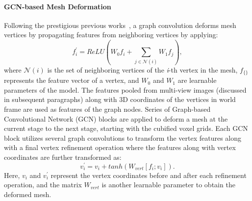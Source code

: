 \paragraph{GCN-based Mesh Deformation}\vspace{-4mm}
Following the prestigious previous works~\cite{wang2018pixel2mesh,wen2019pixel2mesh++}, a graph convolution deforms mesh vertices by propagating features from neighboring vertices by applying:
\begin{equation}
f_{i}^{'} = ReLU(W_0f_i + \sum_{j \in \mathcal{N}(i)} W_1 f_j),
\end{equation}
where $\mathcal{N}(i)$ is the set of neighboring vertices of the \emph{i}-th vertex in the mesh, $f_{\{\}}$ represents the feature vector of a vertex, and $W_0$ and $W_1$ are learnable parameters of the model.
The features pooled from multi-view images (discussed in subsequent paragraphs) along with 3D coordinates of the vertices in world frame are used as features of the graph nodes.
Series of Graph-based Convolutional Network (GCN) blocks are applied to deform a mesh at the current stage to the next stage, starting with the cubified voxel grids.
Each GCN block utilizes several graph convolutions to transform the vertex features along with a final vertex refinement operation where the features along with vertex coordinates are further transformed as:
\begin{equation}
v_i^{'} = v_i + tanh(W_{vert}[f_i;v_i]).
\end{equation}
Here, $v_i$ and $v_i^{'}$ represent the vertex coordinates before and after each refinement operation, and the matrix $W_{vert}$ is another learnable parameter to obtain the deformed mesh.

\label{subsec:contrastive_depth_feature_extraction}
